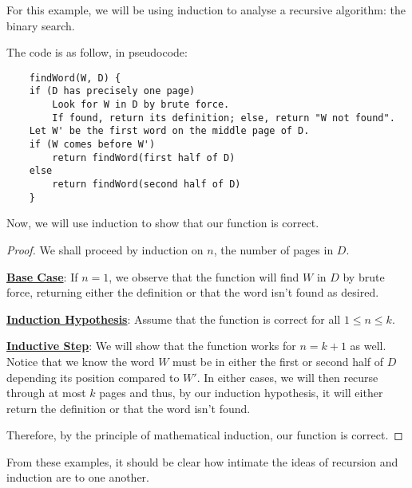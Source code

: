 \documentclass[openany]{book}
\begin{document}
\begin{example}
	For this example, we will be using induction to analyse a recursive algorithm: the binary search.
	
	The code is as follow, in pseudocode:
	\begin{lstlisting}
	findWord(W, D) {
	if (D has precisely one page)
		Look for W in D by brute force.
		If found, return its definition; else, return "W not found".
	Let W' be the first word on the middle page of D.
	if (W comes before W')
		return findWord(first half of D)
	else
		return findWord(second half of D)
	}
	\end{lstlisting}

	Now, we will use induction to show that our function is correct.
	\begin{proof}
		We shall proceed by induction on $n$, the number of pages in $D$.
		
		\underline{\textbf{Base Case}}: If $n=1$, we observe that the function will find $W$ in $D$ by brute force, returning either the definition or that the word isn't found as desired.
		
		\underline{\textbf{Induction Hypothesis}}: Assume that the function is correct for all $1 \leq n \leq k$.
		
		\underline{\textbf{Inductive Step}}: We will show that the function works for $n=k+1$ as well. Notice that we know the word $W$ must be in either the first or second half of $D$ depending its position compared to $W'$. In either cases, we will then recurse through at most $k$ pages and thus, by our induction hypothesis, it will either return the definition or that the word isn't found.
		
		Therefore, by the principle of mathematical induction, our function is correct.
	\end{proof}
\end{example}

From these examples, it should be clear how intimate the ideas of recursion and induction are to one another.
\end{document}
